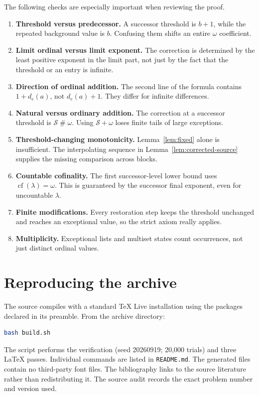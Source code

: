 \documentclass[11pt,letterpaper]{article}
\theoremstyle{definition}
\theoremstyle{remark}
\newcommand{\Sop}{\mathcal S}
\newcommand{\ns}{\mathbin{\#}}
\newcommand{\cf}{\operatorname{cf}}
\begin{document}
The following checks are especially important when reviewing the proof.
\begin{enumerate}[leftmargin=*,itemsep=5pt]
\item \textbf{Threshold versus predecessor.} A successor threshold is $b+1$, while the repeated background value is $b$. Confusing them shifts an entire $\omega$ coefficient.
\item \textbf{Limit ordinal versus limit exponent.} The correction is determined by the least positive exponent in the limit part, not just by the fact that the threshold or an entry is infinite.
\item \textbf{Direction of ordinal addition.} The second line of the formula contains $1+d_e(a)$, not $d_e(a)+1$. They differ for infinite differences.
\item \textbf{Natural versus ordinary addition.} The correction at a successor threshold is $\Sop\ns\omega$. Using $\Sop+\omega$ loses finite tails of large exceptions.
\item \textbf{Threshold-changing monotonicity.} Lemma~\ref{lem:fixed} alone is insufficient. The interpolating sequence in Lemma~\ref{lem:corrected-source} supplies the missing comparison across blocks.
\item \textbf{Countable cofinality.} The first successor-level lower bound uses $\cf(\lambda)=\omega$. This is guaranteed by the successor final exponent, even for uncountable $\lambda$.
\item \textbf{Finite modifications.} Every restoration step keeps the threshold unchanged and reaches an exceptional value, so the strict axiom really applies.
\item \textbf{Multiplicity.} Exceptional lists and multiset states count occurrences, not just distinct ordinal values.
\end{enumerate}

\section{Reproducing the archive}\label{app:reproduce}

The source compiles with a standard TeX Live installation using the packages declared in its preamble. From the archive directory:
\begin{lstlisting}[language=bash]
bash build.sh
\end{lstlisting}
The script performs the verification (seed 20260919; 20,000 trials) and three LaTeX passes. Individual commands are listed in \texttt{README.md}. The generated files contain no third-party font files. The bibliography links to the source literature rather than redistributing it. The source audit records the exact problem number and version used.
\end{document}
